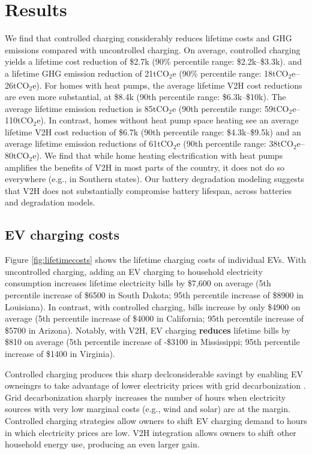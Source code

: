 \documentclass[11pt,preprint]{elsarticle}
\begin{document}
\section{Results}
We find that controlled charging considerably reduces lifetime costs and GHG emissions compared with uncontrolled charging. On average, controlled charging yields a lifetime cost reduction of \$2.7k (90\% percentile range: \$2.2k--\$3.3k). and a lifetime GHG emission reduction of 21tCO$_2$e (90\% percentile range: 18tCO$_2$e--26tCO$_2$e). For homes with heat pumps, the average lifetime V2H cost reductions are even more substantial, at \$8.4k (90th percentile range: \$6.3k--\$10k). The average lifetime emission reduction is 85tCO$_2$e (90th percentile range: 59tCO$_2$e--110tCO$_2$e). In contrast,  homes without heat pump space heating see an average lifetime V2H cost reduction of \$6.7k (90th percentile range: \$4.3k--\$9.5k) and an average lifetime emission reductions of 61tCO$_2$e (90th percentile range: 38tCO$_2$e--80tCO$_2$e). We find that while home heating electrification with heat pumps amplifies the benefits of V2H in most parts of the country, it does not do so everywhere (e.g., in Southern states). Our battery degradation modeling suggests that V2H does not substantially compromise battery lifespan, across batteries and degradation models. %


\subsection{EV charging costs}

Figure \ref{fig:lifetimecosts} shows the lifetime charging costs of individual EVs. With uncontrolled charging, adding an EV charging to household electricity consumption increases lifetime electricity bills by \$7,600 on average (5th percentile increase of \$6500 in South Dakota; 95th percentile increase of \$8900 in Louisiana). In contrast, with controlled charging, bills increase by only \$4900 on average (5th percentile increase of \$4000 in California; 95th percentile increase of \$5700 in Arizona). Notably, with V2H, EV charging \textbf{reduces} lifetime bills by \$810 on average (5th percentile increase of -\$3100 in Mississippi; 95th percentile increase of \$1400 in Virginia). 

Controlled charging produces this sharp declconsiderable savingt by enabling EV owneingrs to take advantage of lower electricity prices with grid decarbonization \cite{mills_impacts_2020}. Grid decarbonization sharply increases the number of hours when electricity sources with very low marginal costs (e.g., wind and solar) are at the margin. Controlled charging strategies allow owners to shift EV charging demand to hours in which electricity prices are low. V2H integration allows owners to shift other household energy use, producing an even larger gain. 
\end{document}
